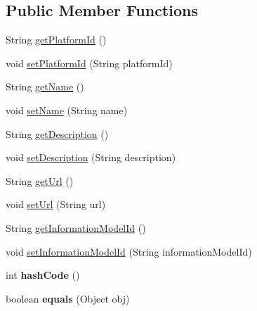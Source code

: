 \subsection*{Public Member Functions}
\begin{DoxyCompactItemize}
\item 
String \hyperlink{classeu_1_1h2020_1_1symbiote_1_1model_1_1Platform_a2a09b94af05846adcf58f6405f0b1fdc}{get\+Platform\+Id} ()
\item 
void \hyperlink{classeu_1_1h2020_1_1symbiote_1_1model_1_1Platform_a3d9e886790d506f713e997f3c587e8ac}{set\+Platform\+Id} (String platform\+Id)
\item 
String \hyperlink{classeu_1_1h2020_1_1symbiote_1_1model_1_1Platform_a9d39e85c470888c7043448f2eb059325}{get\+Name} ()
\item 
void \hyperlink{classeu_1_1h2020_1_1symbiote_1_1model_1_1Platform_af4d5506c08659b3d71dcc8bf69c743ce}{set\+Name} (String name)
\item 
String \hyperlink{classeu_1_1h2020_1_1symbiote_1_1model_1_1Platform_ad4a8d6cbb5ed57e241f783c512f052d9}{get\+Description} ()
\item 
void \hyperlink{classeu_1_1h2020_1_1symbiote_1_1model_1_1Platform_a9ec81f09b9fcd25ae264618591992cb2}{set\+Description} (String description)
\item 
String \hyperlink{classeu_1_1h2020_1_1symbiote_1_1model_1_1Platform_a4ca440b89e37c323dcb812ef07cfb66a}{get\+Url} ()
\item 
void \hyperlink{classeu_1_1h2020_1_1symbiote_1_1model_1_1Platform_ac4d39a74475da2c2318cfd5e3667a5a1}{set\+Url} (String url)
\item 
String \hyperlink{classeu_1_1h2020_1_1symbiote_1_1model_1_1Platform_a799a5bb8e0665457c4b8bfd2b34c9b3c}{get\+Information\+Model\+Id} ()
\item 
void \hyperlink{classeu_1_1h2020_1_1symbiote_1_1model_1_1Platform_ae3e1cb93bcb289d575f215990d7e9499}{set\+Information\+Model\+Id} (String information\+Model\+Id)
\item 
int {\bfseries hash\+Code} ()\hypertarget{classeu_1_1h2020_1_1symbiote_1_1model_1_1Platform_a3b85d6919db55e5a8584a909a4599953}{}\label{classeu_1_1h2020_1_1symbiote_1_1model_1_1Platform_a3b85d6919db55e5a8584a909a4599953}

\item 
boolean {\bfseries equals} (Object obj)\hypertarget{classeu_1_1h2020_1_1symbiote_1_1model_1_1Platform_ab00da56375115817b0594f8865667d30}{}\label{classeu_1_1h2020_1_1symbiote_1_1model_1_1Platform_ab00da56375115817b0594f8865667d30}

\end{DoxyCompactItemize}


